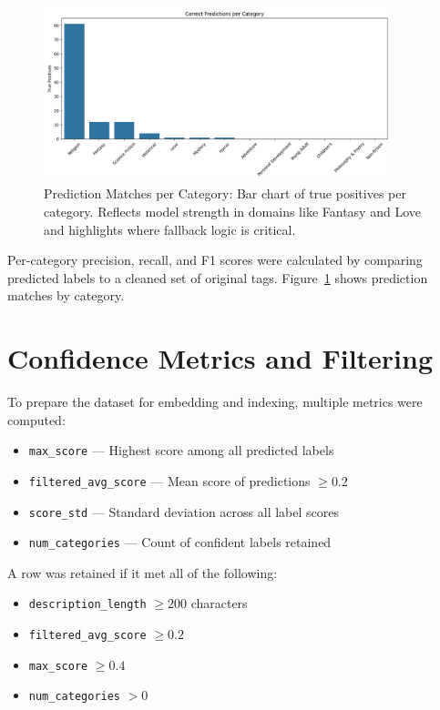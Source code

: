 \begin{figure}[H]
    \centering
    \includegraphics[width=0.9\textwidth]{figures/refine_category_prediction_matches.png}
    \caption{Prediction Matches per Category: Bar chart of true positives per category. Reflects model strength in domains like Fantasy and Love and highlights where fallback logic is critical.}
    \label{fig:refine_category_prediction_matches}
\end{figure}

Per-category precision, recall, and F1 scores were calculated by comparing predicted labels to a cleaned set of original tags. Figure~\ref{fig:refine_category_prediction_matches} shows prediction matches by category.

\section{Confidence Metrics and Filtering}
To prepare the dataset for embedding and indexing, multiple metrics were computed:
\begin{itemize}
    \item \texttt{max\_score} — Highest score among all predicted labels
    \item \texttt{filtered\_avg\_score} — Mean score of predictions $\geq 0.2$
    \item \texttt{score\_std} — Standard deviation across all label scores
    \item \texttt{num\_categories} — Count of confident labels retained
\end{itemize}

A row was retained if it met all of the following:
\begin{itemize}
    \item \texttt{description\_length} $\geq 200$ characters
    \item \texttt{filtered\_avg\_score} $\geq 0.2$
    \item \texttt{max\_score} $\geq 0.4$
    \item \texttt{num\_categories} $> 0$
\end{itemize}

